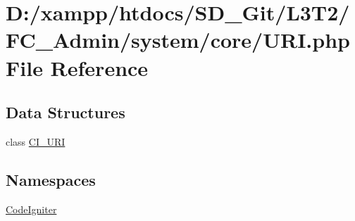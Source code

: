 \hypertarget{_admin_2system_2core_2_u_r_i_8php}{}\section{D\+:/xampp/htdocs/\+S\+D\+\_\+\+Git/\+L3\+T2/\+F\+C\+\_\+\+Admin/system/core/\+U\+R\+I.php File Reference}
\label{_admin_2system_2core_2_u_r_i_8php}
\subsection*{Data Structures}
\begin{DoxyCompactItemize}
\item 
class \hyperlink{class_c_i___u_r_i}{C\+I\+\_\+\+U\+R\+I}
\end{DoxyCompactItemize}
\subsection*{Namespaces}
\begin{DoxyCompactItemize}
\item 
 \hyperlink{namespace_code_igniter}{Code\+Igniter}
\end{DoxyCompactItemize}
